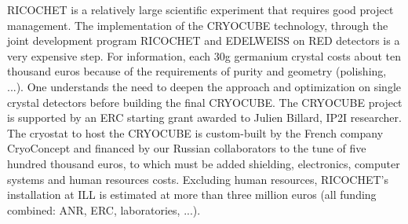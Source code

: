 RICOCHET is a relatively large scientific experiment that requires good project management. The implementation of the CRYOCUBE technology, through the joint development program RICOCHET and EDELWEISS on RED detectors is a very expensive step. For information, each 30g germanium crystal costs about ten thousand euros because of the requirements of purity and geometry (polishing, ...). One understands the need to deepen the approach and optimization on single crystal detectors before building the final CRYOCUBE. The CRYOCUBE project is supported by an ERC starting grant awarded to Julien Billard, IP2I researcher. The cryostat to host the CRYOCUBE is custom-built by the French company CryoConcept and financed by our Russian collaborators to the tune of five hundred thousand euros, to which must be added shielding, electronics, computer systems and human resources costs. Excluding human resources, RICOCHET's installation at ILL is estimated at more than three million euros (all funding combined: ANR, ERC, laboratories, ...).



